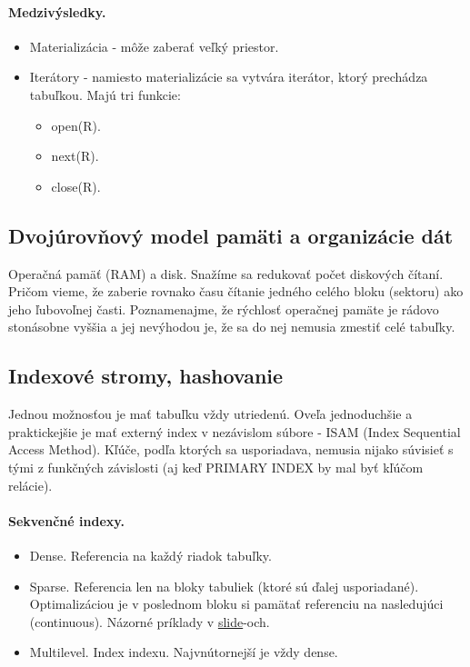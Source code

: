 \documentclass[10pt,a4paper]{article}
\begin{document}
\paragraph{Medzivýsledky.}
\begin{itemize}
\item Materializácia - môže zaberať veľký priestor.
\item Iterátory - namiesto materializácie sa vytvára iterátor, ktorý prechádza tabuľkou. Majú tri funkcie:
\begin{itemize}
\item open(R).
\item next(R).
\item close(R).
\end{itemize}
\end{itemize}

\subsection{Dvojúrovňový model pamäti a organizácie dát}

Operačná pamäť (RAM) a disk. Snažíme sa redukovať počet diskových čítaní. Pričom vieme, že zaberie rovnako času čítanie jedného celého bloku (sektoru) ako jeho ľubovoľnej časti.
Poznamenajme, že rýchlosť operačnej pamäte je rádovo stonásobne vyššia a jej nevýhodou je, že sa do nej nemusia zmestiť celé tabuľky.

\subsection{Indexové stromy, hashovanie}

Jednou možnosťou je mať tabuľku vždy utriedenú. Oveľa jednoduchšie a praktickejšie je mať externý index v nezávislom súbore - ISAM (Index Sequential Access Method).
Kľúče, podľa ktorých sa usporiadava, nemusia nijako súvisieť s tými z funkčných závislosti (aj keď PRIMARY INDEX by mal byť kľúčom relácie).

\paragraph{Sekvenčné indexy.}
\begin{itemize}
\item Dense. Referencia na každý riadok tabuľky.
\item Sparse. Referencia len na bloky tabuliek (ktoré sú ďalej usporiadané). Optimalizáciou je v poslednom bloku si pamätať referenciu na nasledujúci (continuous). Názorné príklady v \href{http://www.dcs.fmph.uniba.sk/~plachetk/TEACHING/DB2011/db2011_10.pdf}{slide}-och.
\item Multilevel. Index indexu. Najvnútornejší je vždy dense.
\end{itemize}
\end{document}
